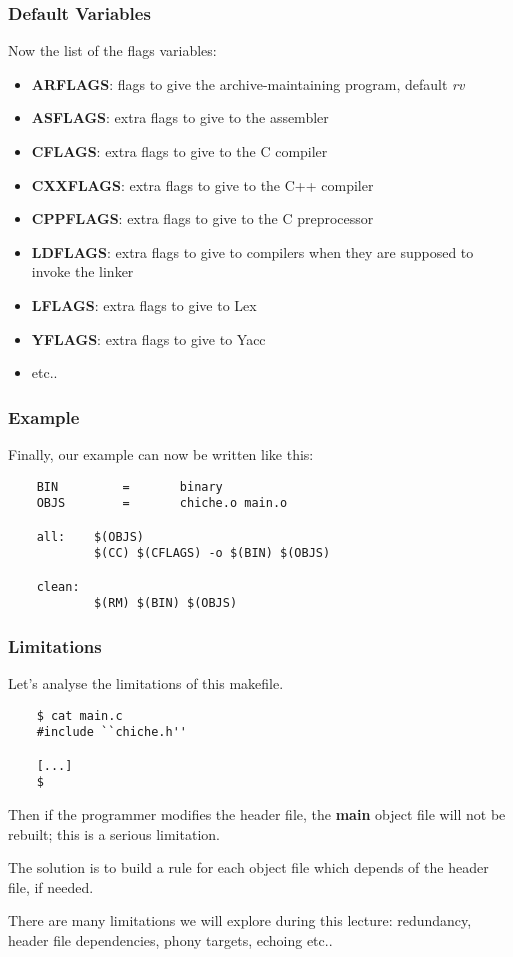 \begin{frame}
  \frametitle{Default Variables}

  Now the list of the flags variables:

  \begin{itemize}
    \item
      \textbf{ARFLAGS}: flags to give the archive-maintaining program,
      default \textit{rv}
    \item
      \textbf{ASFLAGS}: extra flags to give to the assembler
    \item
      \textbf{CFLAGS}: extra flags to give to the C compiler
    \item
      \textbf{CXXFLAGS}: extra flags to give to the C++ compiler
    \item
      \textbf{CPPFLAGS}: extra flags to give to the C preprocessor
    \item
      \textbf{LDFLAGS}: extra flags to give to compilers when they are
      supposed to invoke the linker
    \item
      \textbf{LFLAGS}: extra flags to give to Lex
    \item
      \textbf{YFLAGS}: extra flags to give to Yacc
    \item
      etc..
  \end{itemize}
\end{frame}


\begin{frame}[containsverbatim]
  \frametitle{Example}

  Finally, our example can now be written like this:

  \begin{verbatim}
    BIN         =       binary
    OBJS        =       chiche.o main.o

    all:    $(OBJS)
            $(CC) $(CFLAGS) -o $(BIN) $(OBJS)

    clean:
            $(RM) $(BIN) $(OBJS)
  \end{verbatim}
\end{frame}


\begin{frame}[containsverbatim]
  \frametitle{Limitations}

  Let's analyse the limitations of this makefile.

  \begin{verbatim}
    $ cat main.c
    #include ``chiche.h''

    [...]
    $ 
  \end{verbatim}

  Then if the programmer modifies the header file, the \textbf{main} object
  file will not be rebuilt; this is a serious limitation.

  \nl

  The solution is to build a rule for each object file which depends of
  the header file, if needed.

  \nl

  There are many limitations we will explore during this lecture:
  redundancy, header file dependencies, phony targets, echoing etc..
\end{frame}

